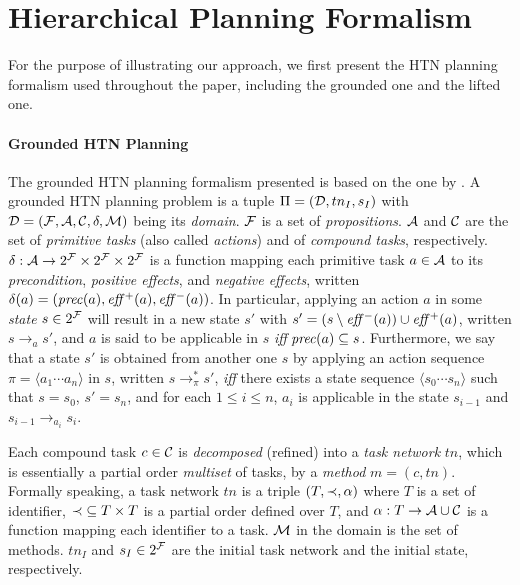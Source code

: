 \section{Hierarchical Planning Formalism}

For the purpose of illustrating our approach, we first present the HTN planning formalism used throughout the paper, including the grounded one and the lifted one. %

\paragraph{Grounded HTN Planning} The grounded HTN planning formalism presented is based on the one by . A grounded HTN planning problem is a tuple $\Pi{} = (\mathcal{D}{}, tn_{I}, s_{I})$ with $\mathcal{D}{} = (\mathcal{F}{}, \mathcal{A}{}, \mathcal{C}{}, \delta, \mathcal{M}{})$ being its \emph{domain}. $\mathcal{F}{}$ is a set of \emph{propositions}. $\mathcal{A}{}$ and $\mathcal{C}{}$ are the set of \emph{primitive tasks} (also called \emph{actions}) and of \emph{compound tasks}, respectively. $\delta: \mathcal{A}{} \to 2^{\mathcal{F}{}} \times 2^{\mathcal{F}{}} \times 2^{\mathcal{F}{}}$ is a function mapping each primitive task $a \in \mathcal{A}{}$ to its \emph{precondition}, \emph{positive effects}, and \emph{negative effects}, written $\delta(a) = (\mathit{prec}(a), \mathit{eff}{}^{+}(a), \mathit{eff}{}^{-}(a))$. In particular, applying an action $a$ in some \emph{state} $s \in 2^{\mathcal{F}{}}$ will result in a new state $s'$ with $s' = (s \setminus \mathit{eff}{}^{-}(a)) \cup \mathit{eff}{}^{+}(a)$, written $s \to_{a} s'$, and $a$ is said to be applicable in $s$ \emph{iff} $\mathit{prec}(a) \subseteq s$. Furthermore, we say that a state $s'$ is obtained from another one $s$ by applying an action sequence $\pi = \langle a_{1} \cdots a_{n} \rangle$ in $s$, written $s \to^{\ast}_{\pi} s'$, \emph{iff} there exists a state sequence $\langle s_{0} \cdots s_{n} \rangle$ such that $s = s_{0}$, $s' = s_{n}$, and for each $1 \leq i \leq n$, $a_{i}$ is applicable in the state $s_{i - 1}$ and $s_{i - 1} \to_{a_{i}} s_{i}$. 

Each compound task $c \in \mathcal{C}{}$ is \emph{decomposed} (refined) into a \emph{task network} $tn$, which is essentially a partial order \emph{multiset} of tasks, by a \emph{method} $m = (c, tn)$. Formally speaking, a task network $tn$ is a triple $(T, \mathord{\prec}{}, \alpha)$ where $T$ is a set of identifier, $\mathord{\prec}{} \subseteq T \times T$ is a partial order defined over $T$, and $\alpha: T \to \mathcal{A}{} \cup \mathcal{C}{}$ is a function mapping each identifier to a task. $\mathcal{M}{}$ in the domain is the set of methods. $tn_{I}$ and $s_{I} \in 2^{\mathcal{F}{}}$ are the initial task network and the initial state, respectively.

